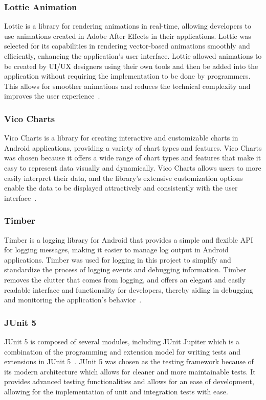 \subsubsection{Lottie Animation}
\label{sec:lottie}
Lottie is a library for rendering animations in real-time, allowing developers to use animations created in Adobe After Effects in their applications. Lottie was selected for its capabilities in rendering vector-based animations smoothly and efficiently, enhancing the application’s user interface. Lottie allowed animations to be created by UI/UX designers using their own tools and then be added into the application without requiring the implementation to be done by programmers. This allows for smoother animations and reduces the technical complexity and improves the user experience~\cite{bib:lottie}.

\subsubsection{Vico Charts}
\label{sec:vicocharts}
Vico Charts is a library for creating interactive and customizable charts in Android applications, providing a variety of chart types and features. Vico Charts was chosen because it offers a wide range of chart types and features that make it easy to represent data visually and dynamically. Vico Charts allows users to more easily interpret their data, and the library’s extensive customization options enable the data to be displayed attractively and consistently with the user interface~\cite{bib:vicocharts}.

\subsubsection{Timber}
\label{sec:timber}
Timber is a logging library for Android that provides a simple and flexible API for logging messages, making it easier to manage log output in Android applications. Timber was used for logging in this project to simplify and standardize the process of logging events and debugging information. Timber removes the clutter that comes from logging, and offers an elegant and easily readable interface and functionality for developers, thereby aiding in debugging and monitoring the application’s behavior~\cite{bib:timber}.

\subsubsection{JUnit 5}
\label{sec:junit}
JUnit 5 is composed of several modules, including JUnit Jupiter which is a combination of the programming and extension model for writing tests and extensions in JUnit 5~\cite{bib:junit}. JUnit 5 was chosen as the testing framework because of its modern architecture which allows for cleaner and more maintainable tests. It provides advanced testing functionalities and allows for an ease of development, allowing for the implementation of unit and integration tests with ease.

